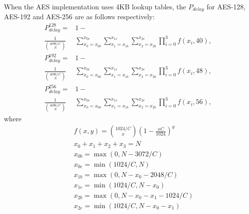 When the AES implementation uses 4KB lookup tables, the $P_{delay}$ for AES-128, AES-192 and AES-256 are as follows respectively:
\begin{align}
    P_{delay}^{128} = &1-   \nonumber \\
    \frac{1}{\binom{4096/C}{N}}&\sum_{x_0=x_{0b}}^{x_{0e}}{\sum_{x_1=x_{1b}}^{x_{1e}}{\sum_{x_2=x_{2b}}^{x_{2e}}{\prod_{i=0}^{3}{f(x_i,40)}}}},
\end{align}
\begin{align}
    P_{delay}^{192} = &1-  \nonumber \\
    \frac{1}{\binom{4096/C}{N}}&\sum_{x_0=x_{0b}}^{x_{0e}}{\sum_{x_1=x_{1b}}^{x_{1e}}{\sum_{x_2=x_{2b}}^{x_{2e}}{\prod_{i=0}^{3}{f(x_i,48)}}}},
\end{align}
\begin{align}
    P_{delay}^{256} = &1-  \nonumber \\
    \frac{1}{\binom{4096/C}{N}}&\sum_{x_0=x_{0b}}^{x_{0e}}{\sum_{x_1=x_{1b}}^{x_{1e}}{\sum_{x_2=x_{2b}}^{x_{2e}}{\prod_{i=0}^{3}{f(x_i,56)}}}},
\end{align}
where
  \begin{eqnarray*}
    &&f(x,y) = \binom{1024/C}{x}(1-\frac{xC}{1024})^{y} \\
    &&x_0+x_1+x_2+x_3 = N \\
    &&x_{0b} = \max(0,N-3072/C) \\
    &&x_{0e} = \min(1024/C,N) \\
    &&x_{1b} = \max(0,N-x_0-2048/C) \\
    &&x_{1e} = \min(1024/C,N-x_0) \\
    &&x_{2b} = \max(0,N-x_0-x_1-1024/C) \\
    &&x_{2e} = \min(1024/C,N-x_0-x_1)
  \end{eqnarray*}

